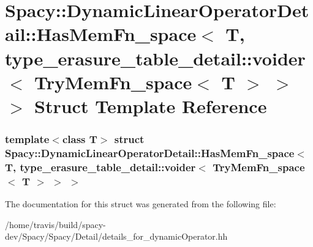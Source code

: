 \hypertarget{structSpacy_1_1DynamicLinearOperatorDetail_1_1HasMemFn__space_3_01T_00_01type__erasure__table__d66a99aed2d44db363dce7754e2785e67}{\section{\-Spacy\-:\-:\-Dynamic\-Linear\-Operator\-Detail\-:\-:\-Has\-Mem\-Fn\-\_\-space$<$ \-T, type\-\_\-erasure\-\_\-table\-\_\-detail\-:\-:voider$<$ \-Try\-Mem\-Fn\-\_\-space$<$ \-T $>$ $>$ $>$ \-Struct \-Template \-Reference}
\label{structSpacy_1_1DynamicLinearOperatorDetail_1_1HasMemFn__space_3_01T_00_01type__erasure__table__d66a99aed2d44db363dce7754e2785e67}
}
\subsubsection*{template$<$class T$>$ struct Spacy\-::\-Dynamic\-Linear\-Operator\-Detail\-::\-Has\-Mem\-Fn\-\_\-space$<$ T, type\-\_\-erasure\-\_\-table\-\_\-detail\-::voider$<$ Try\-Mem\-Fn\-\_\-space$<$ T $>$ $>$ $>$}



\-The documentation for this struct was generated from the following file\-:\begin{DoxyCompactItemize}
\item 
/home/travis/build/spacy-\/dev/\-Spacy/\-Spacy/\-Detail/details\-\_\-for\-\_\-dynamic\-Operator.\-hh\end{DoxyCompactItemize}
